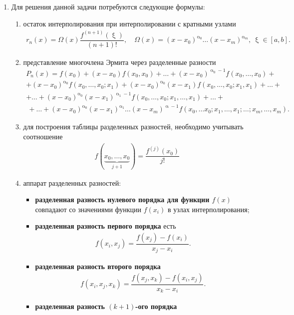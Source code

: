\documentclass[a4paper, 12pt]{article}
\renewcommand{\alpha}{\upalpha}
\renewcommand{\xi}{\upxi}
\begin{document}
\begin{enumerate}
	\newpage
	\item 
	\hypertarget{t7}{}
	Для решения данной задачи потребуются следующие формулы:
	\begin{enumerate}
		\item остаток интерполирования при интерполировании с кратными узлами 
		\begin{eqnarray}
			r_n(x) = \Omega(x) \dfrac{f^{(n+1)}(\xi)}{(n+1)!},\quad \Omega (x) = (x-x_0)^{\alpha_0}\ldots (x-x_m)^{\alpha_m},\ \xi \in [a,b].
		\end{eqnarray}
		\item представление многочлена Эрмита через разделенные разности
		\begin{multline}
			P_n(x) = f(x_0) + (x-x_0)f(x_0, x_0) + \ldots + (x-x_0)^{\alpha_0-1}f(x_0,\ldots, x_0) + \\ + (x-x_0)^{\alpha_0}f(x_0,\ldots, x_0; x_1)+ (x-x_0)^{\alpha_0}(x-x_1)f(x_0,\ldots, x_0; x_1, x_1) +\ldots +\\+ \ldots + (x-x_0)^{\alpha_0}(x-x_1)^{\alpha_1-1} f(x_0,\ldots, x_0; x_1,\ldots, x_1) + \ldots+ \\\ +\ldots + (x-x_0)^{\alpha_0}(x-x_1)^{\alpha_1}\ldots(x-x_m)^{\alpha-1}f(x_0,\ldots x_0; x_1,\ldots, x_1; \ldots; x_{m},\ldots, x_{m}).
		\end{multline}
		\item для построения таблицы разделенных разностей, необходимо учитывать соотношение 
		\begin{eqnarray}
			f(\underbrace{x_0,\ldots, x_0}_{j+1}) = \dfrac{f^{(j)}(x_0)}{j!}
		\end{eqnarray}
		\item аппарат разделенных разностей:
		\begin{itemize}
			\item \textbf{разделенная разность нулевого порядка для функции $f(x)$} совпадают со значениями функции $f(x_i)$ в узлах интерполирования;
			\item \textbf{разделенная разность первого порядка} есть \begin{eqnarray}
				f(x_i, x_j) = \dfrac{f(x_j) - f(x_i)}{x_j - x_i}.
			\end{eqnarray}
			\item \textbf{разделенная разность второго порядка} \begin{eqnarray}
				f(x_i, x_j, x_k) = \dfrac{f(x_j, x_k) - f(x_i, x_j)}{x_k - x_i}.
			\end{eqnarray}
			\item \textbf{разделенная разность $(k+1)$-ого порядка} \begin{eqnarray}

\end{eqnarray}
\end{itemize}
\end{enumerate}
\end{enumerate}
\end{document}

